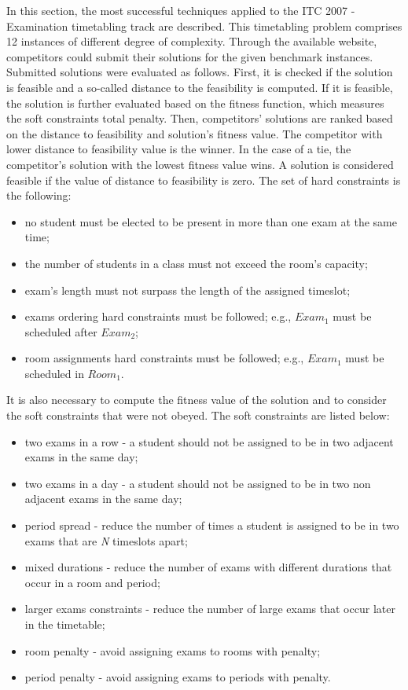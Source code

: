 In this section, the most successful techniques applied to the ITC 2007 - Examination timetabling track are described. This timetabling problem comprises 12 instances of different degree of complexity. Through the available website, competitors could submit their solutions for the given benchmark instances. Submitted solutions were evaluated as follows. First, it is checked if the solution is feasible and a so-called distance to the feasibility is computed. If it is feasible, the solution is further evaluated based on the fitness function, which measures the soft constraints total penalty. Then, competitors' solutions are ranked based on the distance to feasibility and solution's fitness value. The competitor with lower distance to feasibility value is the winner. In the case of a tie, the competitor's solution with the lowest fitness value wins. A solution is considered feasible if the value of distance to feasibility is zero. The set of hard constraints is the following:
\begin{itemize}
	\item no student must be elected to be present in more than one exam at the same time;
	\item the number of students in a class must not exceed the room's capacity;
	\item exam's length must not surpass the length of the assigned timeslot;
	\item exams ordering hard constraints must be followed; e.g., $Exam_1$ must be scheduled after $Exam_2$;
	\item room assignments hard constraints must be followed; e.g., 	$Exam_1$ must be scheduled in $Room_1$.
\end{itemize}

It is also necessary to compute the fitness value of the solution and to consider the soft constraints that were not obeyed. The soft constraints are listed below:
\begin{itemize}
	\item two exams in a row - a student should not be assigned to be in two adjacent exams in the same day;
	\item two exams in a day - a student should not be assigned to be in two non adjacent exams in the same day;
	\item period spread - reduce the number of times a student is assigned to be in two exams that are \textit{N} timeslots apart;
	\item mixed durations - reduce the number of exams with different durations that occur in a room and period;
	\item larger exams constraints - reduce the number of large exams that occur later in the timetable;
	\item room penalty - avoid assigning exams to rooms with penalty;
	\item period penalty - avoid assigning exams to periods with penalty.
\end{itemize}

